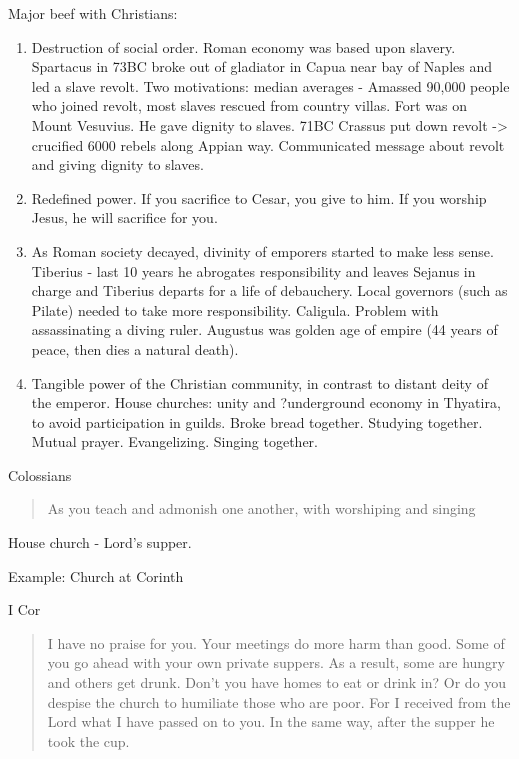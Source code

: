\documentclass[
]{book}
\begin{document}
Major beef with Christians:

\begin{enumerate}
\def\labelenumi{\arabic{enumi})}
\item
  Destruction of social order. Roman economy was based upon slavery. Spartacus in 73BC broke out of gladiator in Capua near bay of Naples and led a slave revolt. Two motivations: median averages - Amassed 90,000 people who joined revolt, most slaves rescued from country villas. Fort was on Mount Vesuvius. He gave dignity to slaves. 71BC Crassus put down revolt -\textgreater{} crucified 6000 rebels along Appian way. Communicated message about revolt and giving dignity to slaves.
\item
  Redefined power. If you sacrifice to Cesar, you give to him. If you worship Jesus, he will sacrifice for you.
\item
  As Roman society decayed, divinity of emporers started to make less sense. Tiberius - last 10 years he abrogates responsibility and leaves Sejanus in charge and Tiberius departs for a life of debauchery. Local governors (such as Pilate) needed to take more responsibility. Caligula. Problem with assassinating a diving ruler. Augustus was golden age of empire (44 years of peace, then dies a natural death).
\item
  Tangible power of the Christian community, in contrast to distant deity of the emperor. House churches: unity and ?underground economy in Thyatira, to avoid participation in guilds. Broke bread together. Studying together. Mutual prayer. Evangelizing. Singing together.
\end{enumerate}

Colossians

\begin{quote}
As you teach and admonish one another, with worshiping and singing
\end{quote}

House church - Lord's supper.

Example: Church at Corinth

I Cor

\begin{quote}
I have no praise for you. Your meetings do more harm than good. Some of you go ahead with your own private suppers. As a result, some are hungry and others get drunk. Don't you have homes to eat or drink in? Or do you despise the church to humiliate those who are poor. For I received from the Lord what I have passed on to you. In the same way, after the supper he took the cup.
\end{quote}
\end{document}
